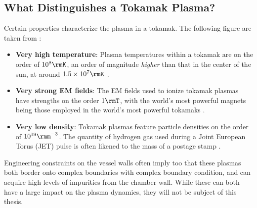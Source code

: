 \subsection*{What Distinguishes a Tokamak Plasma?}
    Certain properties characterize the plasma in a tokamak. The following figure are taken from \cite{Wes00}:
    \begin{itemize}
        \item  {\bf Very high temperature}: Plasma temperatures within a tokamak are on the order of $10^{8}\rmK$, an order of magnitude \emph{higher} than that in the center of the sun, at around $1.5\times10^{7}\rmK$ \BA{[Ref]}.
        \item  {\bf Very strong EM fields}: The EM fields used to ionize tokamak plasmas have strengths on the order $1\rmT$, with the world's most powerful magnets being those employed in the world's most powerful tokamaks \BA{[Ref]}.
        \item  {\bf Very low density}: Tokamak plasmas feature particle densities on the order of $10^{19}\rmm^{- 3}$. The quantity of hydrogen gas used during a Joint European Torus (JET) pulse is often likened to the mass of a postage stamp \BA{[Ref]}.
    \end{itemize}
    Engineering constraints on the vessel walls often imply too that these plasmas both border onto complex boundaries with complex boundary condition, and can acquire high-levels of impurities from the chamber wall. While these can both have a large impact on the plasma dynamics, they will not be subject of this thesis.
    